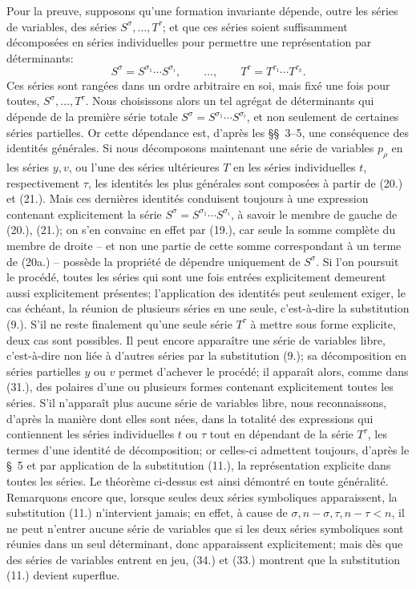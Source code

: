 \documentclass[11pt]{article}
\begin{document}
Pour la preuve, supposons qu'une formation invariante dépende, outre les séries de variables, des séries $S^\sigma,\ldots,T^\tau$; et que ces séries soient suffisamment décomposées en séries individuelles pour permettre une représentation par déterminants:
\[
S^\sigma=S^{\sigma_1}\cdots S^{\sigma_i},\qquad
\ldots,\qquad
T^\tau=T^{\tau_1}\cdots T^{\tau_k}.
\]
Ces séries sont rangées dans un ordre arbitraire en soi, mais fixé une fois pour toutes, $S^\sigma,\ldots,T^\tau$. Nous choisissons alors un tel agrégat de déterminants qui dépende de la première série totale $S^\sigma=S^{\sigma_1}\cdots S^{\sigma_i}$, et non seulement de certaines séries partielles. Or cette dépendance est, d'après les \S\S\ 3--5, une conséquence des identités générales. Si nous décomposons maintenant une série de variables $p_\rho$ en les séries $y,v$, ou l'une des séries ultérieures $T$ en les séries individuelles $t$, respectivement $\tau$, les identités les plus générales sont composées à partir de (20.) et (21.). Mais ces dernières identités conduisent toujours à une expression contenant explicitement la série $S^\sigma=S^{\sigma_1}\cdots S^{\sigma_i}$, à savoir le membre de gauche de (20.), (21.); on s'en convainc en effet par (19.), car seule la somme complète du membre de droite -- et non une partie de cette somme correspondant à un terme de (20a.) -- possède la propriété de dépendre uniquement de $S^\sigma$. Si l'on poursuit le procédé, toutes les séries qui sont une fois entrées explicitement demeurent aussi explicitement présentes; l'application des identités peut seulement exiger, le cas échéant, la réunion de plusieurs séries en une seule, c'est-à-dire la substitution (9.). S'il ne reste finalement qu'une seule série $T^\tau$ à mettre sous forme explicite, deux cas sont possibles. Il peut encore apparaître une série de variables libre, c'est-à-dire non liée à d'autres séries par la substitution (9.); sa décomposition en séries partielles $y$ ou $v$ permet d'achever le procédé; il apparaît alors, comme dans (31.), des polaires d'une ou plusieurs formes contenant explicitement toutes les séries. S'il n'apparaît plus aucune série de variables libre, nous reconnaissons, d'après la manière dont elles sont nées, dans la totalité des expressions qui contiennent les séries individuelles $t$ ou $\tau$ tout en dépendant de la série $T^\tau$, les termes d'une identité de décomposition; or celles-ci admettent toujours, d'après le \S\ 5 et par application de la substitution (11.), la représentation explicite dans toutes les séries. Le théorème ci-dessus est ainsi démontré en toute généralité. Remarquons encore que, lorsque seules deux séries symboliques apparaissent, la substitution (11.) n'intervient jamais; en effet, à cause de $\sigma,n-\sigma,\tau,n-\tau<n$, il ne peut n'entrer aucune série de variables que si les deux séries symboliques sont réunies dans un seul déterminant, donc apparaissent explicitement; mais dès que des séries de variables entrent en jeu, (34.) et (33.) montrent que la substitution (11.) devient superflue.
\end{document}
